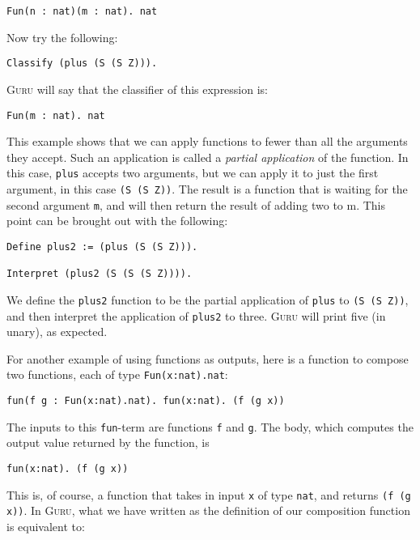 \documentclass{book}[12pt]
\newcommand{\guru}[0]{\textsc{Guru}\xspace}
\begin{document}
\begin{verbatim}
Fun(n : nat)(m : nat). nat
\end{verbatim}

\noindent Now try the following:

\begin{verbatim}
Classify (plus (S (S Z))).
\end{verbatim}

\noindent \guru will say that the classifier of this expression is:

\begin{verbatim}
Fun(m : nat). nat
\end{verbatim}

\noindent This example shows that we can apply functions to fewer than
all the arguments they accept.  Such an application is called a
\emph{partial application} of the function.  In this case,
\texttt{plus} accepts two arguments, but we can apply it to just the
first argument, in this case \texttt{(S (S Z))}.  The result is a
function that is waiting for the second argument \texttt{m}, and will
then return the result of adding two to m.  This point can be brought
out with the following:

\begin{verbatim}
Define plus2 := (plus (S (S Z))).

Interpret (plus2 (S (S (S Z)))).
\end{verbatim}

\noindent We define the \texttt{plus2} function to be the partial
application of \texttt{plus} to \texttt{(S (S Z))}, and then interpret
the application of \texttt{plus2} to three.  \guru will print five
(in unary), as expected.

For another example of using functions as outputs, here is a function
to compose two functions, each of type \texttt{Fun(x:nat).nat}:

\begin{verbatim}
fun(f g : Fun(x:nat).nat). fun(x:nat). (f (g x))
\end{verbatim}

\noindent The inputs to this \texttt{fun}-term are functions \texttt{f} and \texttt{g}.
The body, which computes the output value returned by the function, is

\begin{verbatim}
fun(x:nat). (f (g x))
\end{verbatim}

\noindent This is, of course, a function that takes in input \texttt{x} of type
\texttt{nat}, and returns \texttt{(f (g x))}.  In \guru, what we have written
as the definition of our composition function is equivalent to:
\end{document}
